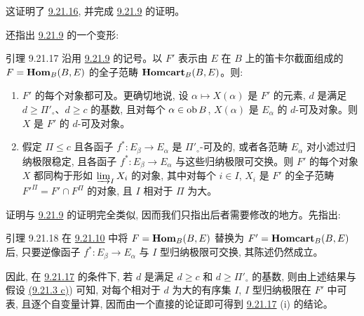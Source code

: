 这证明了 \hyperref[I.lem9.21.16]{9.21.16}, 并完成 \hyperref[I.lem9.21.9]{9.21.9} 的证明。

还指出 \hyperref[I.lem9.21.9]{9.21.9} 的一个变形:

\begin{enonce*}{引理 9.21.17}
沿用 \hyperref[I.lem9.21.9]{9.21.9} 的记号。以 $F'$ 表示由 $E$ 在 $B$ 上的笛卡尔截面组成的 $F=\operatorname{\mathbf{Hom}}_B(B,E)$ 的全子范畴 $\operatorname{\mathbf{Homcart}}_B(B,E)$。则:
\begin{enumerate}
\renewcommand{\theenumi}{\roman{enumi}}
\renewcommand{\labelenumi}{(\theenumi)}
\item $F'$ 的每个对象都可及。更确切地说, 设 $\alpha\mapsto X(\alpha)$ 是 $F'$ 的元素, $d$ 是满足 $d\geq\Pi'_\circ$、$d\geq c$ 的基数, 且对每个 $\alpha\in\operatorname{ob} B$, $X(\alpha)$ 是 $E_\alpha$ 的 $d$-可及对象。则 $X$ 是 $F'$ 的 $d$-可及对象。

\item 假定 $\Pi\leq c$ 且各函子 $f^\ast:E_\beta\rightarrow E_\alpha$ 是 $\Pi'_\circ$-可及的, 或者各范畴 $E_\alpha$ 对小滤过归纳极限稳定, 且各函子 $f^\ast:E_\beta\rightarrow E_\alpha$ 与这些归纳极限可交换。则 $F'$ 的每个对象 $X$ 都同构于形如 $\varinjlim_I X_i$ 的对象, 其中对每个 $i\in I$, $X_i$ 是 $F'$ 的全子范畴 ${F'}^{\Pi}=F'\cap F^{\Pi}$ 的对象, 且 $I$ 相对于 $\Pi$ 为大。
\end{enumerate}
\end{enonce*}

证明\pageoriginale 与 \hyperref[I.lem9.21.9]{9.21.9} 的证明完全类似, 因而我们只指出后者需要修改的地方。先指出:


\begin{enonce*}{引理 9.21.18}
在 \hyperref[I.lem9.21.10]{9.21.10} 中将 $F=\operatorname{\mathbf{Hom}}_B(B,E)$ 替换为 $F'=\operatorname{\mathbf{Homcart}}_B(B,E)$ 后, 只要逆像函子 $f^\ast:E_{\beta}\rightarrow
E_{\alpha}$ 与 $I$ 型归纳极限可交换, 其陈述仍然成立。
\end{enonce*}

因此, 在 \hyperref[I.lem9.21.17]{9.21.17} 的条件下, 若 $d$ 是满足 $d\geq c$ 和 $d\geq \Pi'_{\circ}$ 的基数, 则由上述结果与假设 \hyperlink{sga4.exp.I.equation.9.21.3}{(9.21.3 c)}) 可知, 对每个相对于 $d$ 为大的有序集 $I$, $I$ 型归纳极限在 $F'$ 中可表, 且逐个自变量计算, 因而由一个直接的论证即可得到 \hyperref[I.lem9.21.17]{9.21.17} (i) 的结论。

